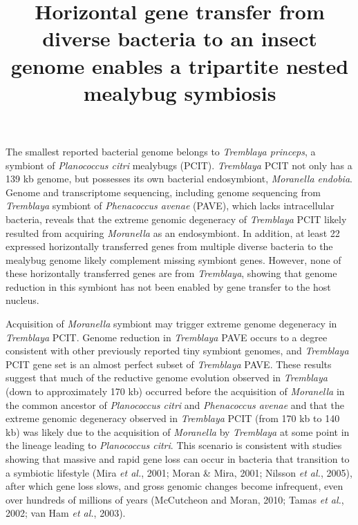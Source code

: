 \documentclass[11pt]{article}
\title{Horizontal gene transfer from diverse bacteria to an insect genome enables a tripartite nested mealybug symbiosis}
\author{}
\date{}
\begin{document}
  \maketitle

  \linenumbers
The smallest reported bacterial genome belongs to \textit{Tremblaya princeps}, a symbiont of \textit{Planococcus citri} mealybugs (PCIT). 
\textit{Tremblaya} PCIT not only has a 139 kb genome, but possesses its own bacterial endosymbiont, \textit{Moranella endobia}. 
Genome and transcriptome sequencing, including genome sequencing from \textit{Tremblaya} symbiont of \textit{Phenacoccus avenae} (PAVE), which lacks intracellular bacteria, reveals that the extreme genomic degeneracy of \textit{Tremblaya} PCIT likely resulted from acquiring \textit{Moranella} as an endosymbiont. 
In addition, at least 22 expressed horizontally transferred genes from multiple diverse bacteria to the mealybug genome likely complement missing symbiont genes. 
However, none of these horizontally transferred genes are from \textit{Tremblaya}, showing that genome reduction in this symbiont has not been enabled by gene transfer to the host nucleus.

\newline

Acquisition of \textit{Moranella} symbiont may trigger extreme genome degeneracy in \textit{Tremblaya} PCIT. 
Genome reduction in \textit{Tremblaya} PAVE occurs to a degree consistent with other previously reported tiny symbiont genomes, and \textit{Tremblaya} PCIT gene set is an almost perfect subset of \textit{Tremblaya} PAVE. 
These results suggest that much of the reductive genome evolution observed in \textit{Tremblaya} (down to approximately 170 kb) occurred before the acquisition of \textit{Moranella} in the common ancestor of \textit{Planococcus citri} and \textit{Phenacoccus avenae} and that the extreme genomic degeneracy observed in \textit{Tremblaya} PCIT (from 170 kb to 140 kb) was likely due to the acquisition of \textit{Moranella} by \textit{Tremblaya} at some point in the lineage leading to \textit{Planococcus citri}. 
This scenario is consistent with studies showing that massive and rapid gene loss can occur in bacteria that transition to a symbiotic lifestyle (Mira \textit{et al.}, 2001; Moran & Mira, 2001; Nilsson \textit{et al.}, 2005), after which gene loss slows, and gross genomic changes become infrequent, even over hundreds of millions of years (McCutcheon and Moran, 2010; Tamas
\textit{et al.}, 2002; van Ham \textit{et al.}, 2003). 
\end{document}
